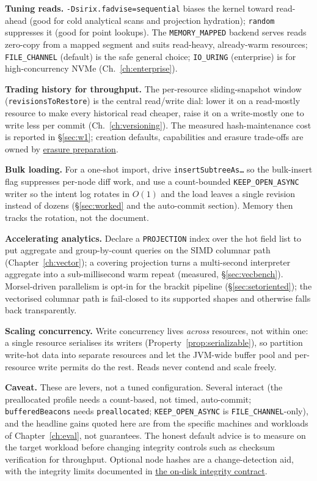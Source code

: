 \documentclass[11pt,a4paper,oneside]{report}
\theoremstyle{sirixthm}
\newcommand{\code}[1]{\texttt{#1}}
\begin{document}
\textbf{Tuning reads.} \code{-Dsirix.fadvise=sequential} biases the kernel toward read-ahead (good for
cold analytical scans and projection hydration); \code{random} suppresses it (good for point lookups).
The \code{MEMORY\_MAPPED} backend serves reads zero-copy from a mapped segment and suits read-heavy,
already-warm resources; \code{FILE\_CHANNEL} (default) is the safe general choice; \code{IO\_URING}
(enterprise) is for high-concurrency NVMe (Ch.~\ref{ch:enterprise}).

\textbf{Trading history for throughput.} The per-resource sliding-snapshot window
(\code{revisionsToRestore}) is the central read/write dial: lower it on a read-mostly resource to make
every historical read cheaper, raise it on a write-mostly one to write less per commit
(Ch.~\ref{ch:versioning}). The measured hash-maintenance cost is reported in \S\ref{sec:w1};
creation defaults, capabilities and erasure trade-offs are owned by
\href{ERASURE_PREPARATION.md}{erasure preparation}.

\textbf{Bulk loading.} For a one-shot import, drive \code{insertSubtreeAs\ldots} so the bulk-insert flag
suppresses per-node diff work, and use a count-bounded \code{KEEP\_OPEN\_ASYNC} writer so the intent log
rotates in $O(1)$ and the load leaves a single revision instead of dozens (\S\ref{sec:worked} and the
auto-commit section). Memory then tracks the rotation, not the document.

\textbf{Accelerating analytics.} Declare a \code{PROJECTION} index over the hot field list to put
aggregate and group-by-count queries on the SIMD columnar path (Chapter~\ref{ch:vector}); a covering
projection turns a multi-second interpreter aggregate into a sub-millisecond warm repeat (measured,
\S\ref{sec:vecbench}). Morsel-driven
parallelism is opt-in for the brackit pipeline (\S\ref{sec:setoriented}); the vectorised columnar path is
fail-closed to its supported shapes and otherwise falls back transparently.

\textbf{Scaling concurrency.} Write concurrency lives \emph{across} resources, not within one: a single
resource serialises its writers (Property~\ref{prop:serializable}), so partition write-hot data into
separate resources and let the JVM-wide buffer pool and per-resource write permits do the rest. Reads
never contend and scale freely.

\begin{honesty}
\small\textbf{Caveat.} These are levers, not a tuned configuration. Several interact (the preallocated
profile needs a count-based, not timed, auto-commit; \code{bufferedBeacons} needs \code{preallocated};
\code{KEEP\_OPEN\_ASYNC} is \code{FILE\_CHANNEL}-only), and the headline gains quoted here are from the
specific machines and workloads of Chapter~\ref{ch:eval}, not guarantees. The honest default advice is to
measure on the target workload before changing integrity controls such as checksum verification
for throughput. Optional node hashes are a change-detection aid, with the integrity limits
documented in \href{DISK_FORMAT.md\#3-integrity}{the on-disk integrity contract}.
\end{honesty}
\end{document}
